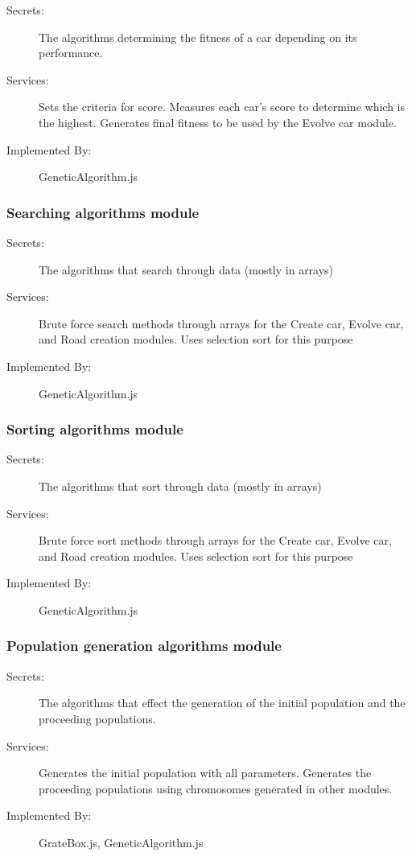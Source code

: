 \documentclass[12pt, titlepage]{article}
\begin{document}
\begin{description}
\item[Secrets:] The algorithms determining the fitness of  a car depending on 
its performance.
\item[Services:] Sets the criteria for score. Measures each car's score to 
determine which is the highest. Generates final fitness to be used by the Evolve 
car module.
\item[Implemented By:] \color{RoyalPurple}GeneticAlgorithm.js
\end{description}

\subsubsection{Searching algorithms module}

\begin{description}
\item[Secrets:] The algorithms that search through data (mostly in arrays)
\item[Services:] Brute force search methods through arrays for the Create car, 
Evolve car, and Road creation modules. Uses selection sort for this purpose
\item[Implemented By:] \color{RoyalPurple}GeneticAlgorithm.js
\end{description}

\subsubsection{Sorting algorithms module}

\begin{description}
\item[Secrets:] The algorithms that sort through data (mostly in arrays)
\item[Services:] Brute force sort methods through arrays for the Create car, 
Evolve car, and Road creation modules. Uses selection sort for this purpose
\item[Implemented By:] \color{RoyalPurple}GeneticAlgorithm.js
\end{description}

\subsubsection{Population generation algorithms module}

\begin{description}
\item[Secrets:] The algorithms that effect the generation of the initial 
population and the proceeding populations. 
\item[Services:] Generates the initial population with all parameters. Generates 
the proceeding populations using chromosomes generated in other modules. 
\item[Implemented By:] \color{RoyalPurple}GrateBox.js, GeneticAlgorithm.js
\end{description}
\end{document}
